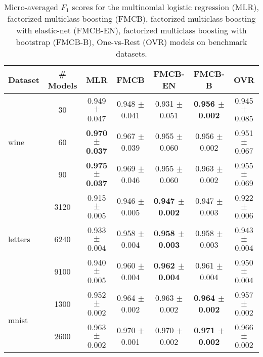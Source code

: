 \documentclass{standalone}
\begin{document}



\begin{table*}%
\label{exp-results}
\centering
\caption{Micro-averaged $F_{1}$ scores for the multinomial logistic regression (MLR), factorized multiclass boosting (FMCB), factorized multiclass boosting with elastic-net (FMCB-EN), factorized multiclass boosting with bootstrap (FMCB-B), One-vs-Rest (OVR) models on benchmark datasets.}
\vskip 0.15in
\begin{small}
\begin{sc}
{\renewcommand{\arraystretch}{1.2}%
\begin{tabular}{|l|c|c|c|c|c|c|}
\hline
\abovespace\belowspace
Dataset		& \# Models 	& MLR & FMCB & FMCB-EN 	& FMCB-B & OVR  \\
\hline\hline
\multirow{3}{*}{wine}
	& 30    		& 0.949 $\pm$ 0.047 		 & 0.948 $\pm$ 0.041 & 0.931 $\pm$ 0.051 & \textbf{0.956 $\pm$ 0.002} & 0.945 $\pm$ 0.085\\
	& 60	  		& \textbf{0.970 $\pm$ 0.037} & 0.967 $\pm$ 0.039 & 0.955 $\pm$ 0.060 & 0.956 $\pm$ 0.002 & 0.951 $\pm$ 0.067\\
	& 90    		& \textbf{0.975 $\pm$ 0.037} & 0.969 $\pm$ 0.046 & 0.955 $\pm$ 0.060 & 0.963 $\pm$ 0.002 & 0.955 $\pm$ 0.069\\
\hline
\multirow{3}{*}{letters}
	& 3120			& 0.915 $\pm$ 0.005 & 0.946 $\pm$ 0.005 & \textbf{0.947 $\pm$ 0.002} & 0.947 $\pm$ 0.003 & 0.922 $\pm$ 0.006\\
	& 6240	 		& 0.933 $\pm$ 0.004 & 0.958 $\pm$ 0.004 & \textbf{0.958 $\pm$ 0.003} & 0.958 $\pm$ 0.003 & 0.943 $\pm$ 0.004\\
	& 9100 			& 0.940 $\pm$ 0.005 & 0.960 $\pm$ 0.004 & \textbf{0.962 $\pm$ 0.004} & 0.961 $\pm$ 0.004 & 0.950 $\pm$ 0.004\\
\hline
\multirow{3}{*}{mnist}
	& 1300			& 0.952 $\pm$ 0.002 & 0.964 $\pm$ 0.002 			& 0.963 $\pm$ 0.002 			& \textbf{0.964 $\pm$ 0.002} & 0.957 $\pm$ 0.002\\
	& 2600			& 0.963 $\pm$ 0.002 & 0.970 $\pm$ 0.001 	& 0.970 $\pm$ 0.002 			& \textbf{0.971 $\pm$ 0.002} & 0.966 $\pm$ 0.002\\

\end{tabular}}
\end{sc}
\end{small}
\end{table*}
\end{document}
